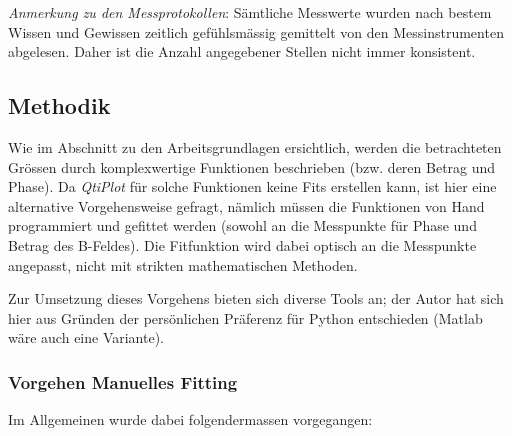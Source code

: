 \emph{Anmerkung  zu den  Messprotokollen}: S\"amtliche  Messwerte wurden  nach
bestem  Wissen  und  Gewissen  zeitlich gef\"uhlsm\"assig  gemittelt  von  den
Messinstrumenten  abgelesen. Daher ist  die Anzahl  angegebener Stellen  nicht
immer konsistent.


\subsection{Methodik}
\label{sec:ausw:subsec:methodik}

Wie im Abschnitt zu den Arbeitsgrundlagen ersichtlich, werden die betrachteten
Gr\"ossen durch  komplexwertige Funktionen beschrieben (bzw.  deren Betrag und
Phase). Da \emph{QtiPlot}  f\"ur solche Funktionen keine  Fits erstellen kann,
ist  hier  eine alternative  Vorgehensweise  gefragt,  n\"amlich m\"ussen  die
Funktionen von Hand programmiert und gefittet werden (sowohl an die Messpunkte
f\"ur Phase  und Betrag des  B-Feldes). Die Fitfunktion wird dabei  optisch an
die Messpunkte angepasst, nicht mit strikten mathematischen Methoden.

Zur  Umsetzung  dieses Vorgehens  bieten  sich  diverse  Tools an;  der  Autor
hat  sich  hier aus  Gr\"unden  der  pers\"onlichen Pr\"aferenz  f\"ur  Python
entschieden (Matlab w\"are auch eine Variante).


\subsubsection{Vorgehen Manuelles Fitting}
\label{sec:ausw:subsec:methodik:subsubsec:fitting}
Im Allgemeinen wurde dabei folgendermassen vorgegangen:


